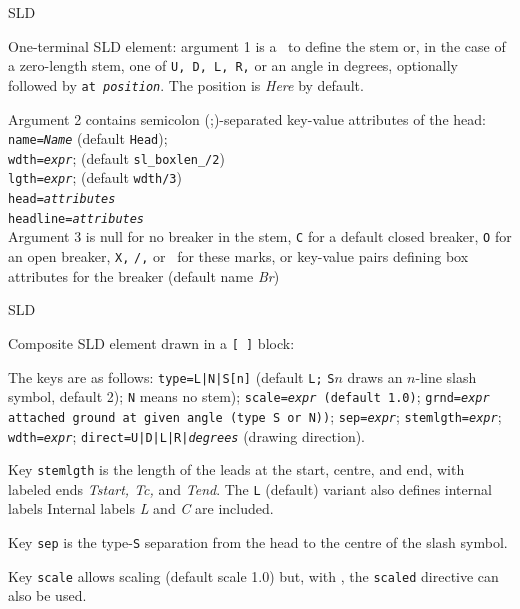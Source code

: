 %
  {SLD}%
  {One-terminal SLD element: argument 1 is a \linespec\ to define the stem
   or, in the case of a zero-length stem, one of {\tt U, D, L, R,} or an
   angle in degrees, optionally followed by {\tt at {\sl position}}.
   The position is {\sl Here} by default.

   Argument 2 contains semicolon (;)-separated key-value attributes
   of the head:\\
   {\tt name={\sl{}Name}} (default {\tt Head});\\
   {\tt wdth={\sl{}expr}}; (default {\tt sl\_boxlen\_/2})\\
   {\tt lgth={\sl{}expr}}; (default {\tt wdth/3})\\
   {\tt head={\sl attributes}}\\
   {\tt headline={\sl attributes}}\\

   Argument 3 is null for no breaker in the stem, {\tt C} for a default
   closed breaker, {\tt O} for an open breaker, {\tt X,} {\tt /,} or \bsl\ for
   these marks, or
   key-value pairs defining box attributes for the breaker
   (default name {\sl Br})
   \label{sl_capacitor}
   }%
%
  {SLD}%
  {Composite SLD element drawn in a {\tt [ ]} block:

   The keys are as follows:
   {\tt type=L|N|S[n]} (default {\tt L;} {\tt S$n$} draws an $n$-line slash
     symbol, default 2); {\tt N} means no stem);
   {\tt scale={\sl expr} (default 1.0)};
   {\tt grnd={\sl expr} attached ground at given angle
     (type {\tt S} or {\tt N}))};
   {\tt sep={\sl{}expr}};
   {\tt stemlgth={\sl{}expr}};
   {\tt wdth={\sl{}expr}};
   {\tt direct=U|D|L|R|{\sl degrees}} (drawing direction).

   Key {\tt stemlgth} is the length of the leads at the start, centre, and end,
     with labeled ends {\sl Tstart, Tc,} and {\sl Tend}.
     The {\tt L} (default) variant also defines internal labels
     Internal labels {\sl L} and {\sl C} are included.

   Key {\tt sep} is the type-{\tt S} separation from the head to the centre
     of the slash symbol.

   Key {\tt scale} allows scaling (default scale 1.0) but, with \dpic,
     the {\tt scaled} directive can also be used.
   }%
